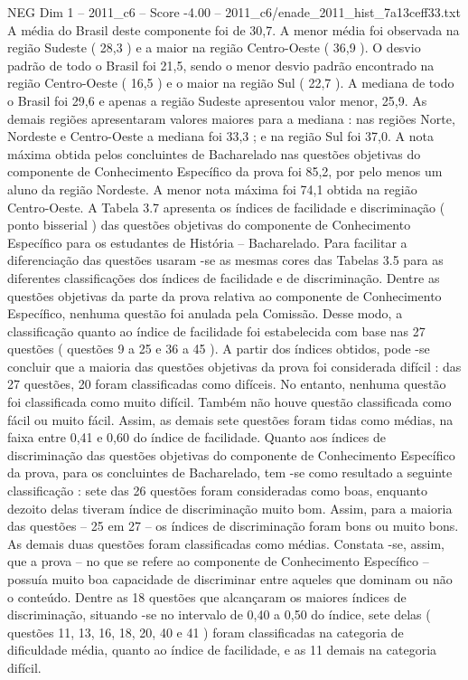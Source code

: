 \begin{textsample}{NEG Dim 1 – 2011\_c6 – Score -4.00 – 2011\_c6/enade\_2011\_hist\_7a13ceff33.txt}
A média do Brasil deste componente foi de 30,7.
A menor média foi observada na região Sudeste ( 28,3 ) e a maior na região Centro-Oeste ( 36,9 ).
O desvio padrão de todo o Brasil foi 21,5, sendo o menor desvio padrão encontrado na região Centro-Oeste ( 16,5 ) e o maior na região Sul ( 22,7 ).
A mediana de todo o Brasil foi 29,6 e apenas a região Sudeste apresentou valor menor, 25,9.
As demais regiões apresentaram valores maiores para a mediana : nas regiões Norte, Nordeste e Centro-Oeste a mediana foi 33,3 ; e na região Sul foi 37,0.
A nota máxima obtida pelos concluintes de Bacharelado nas questões objetivas do componente de Conhecimento Específico da prova foi 85,2, por pelo menos um aluno da região Nordeste.
A menor nota máxima foi 74,1 obtida na região Centro-Oeste.
A Tabela 3.7 apresenta os índices de facilidade e discriminação ( ponto bisserial ) das questões objetivas do componente de Conhecimento Específico para os estudantes de História – Bacharelado.
Para facilitar a diferenciação das questões usaram -se as mesmas cores das Tabelas 3.5 para as diferentes classificações dos índices de facilidade e de discriminação.
Dentre as questões objetivas da parte da prova relativa ao componente de Conhecimento Específico, nenhuma questão foi anulada pela Comissão.
Desse modo, a classificação quanto ao índice de facilidade foi estabelecida com base nas 27 questões ( questões 9 a 25 e 36 a 45 ).
A partir dos índices obtidos, pode -se concluir que a maioria das questões objetivas da prova foi considerada difícil : das 27 questões, 20 foram classificadas como difíceis.
No entanto, nenhuma questão foi classificada como muito difícil.
Também não houve questão classificada como fácil ou muito fácil.
Assim, as demais sete questões foram tidas como médias, na faixa entre 0,41 e 0,60 do índice de facilidade.
Quanto aos índices de discriminação das questões objetivas do componente de Conhecimento Específico da prova, para os concluintes de Bacharelado, tem -se como resultado a seguinte classificação : sete das 26 questões foram consideradas como boas, enquanto dezoito delas tiveram índice de discriminação muito bom.
Assim, para a maioria das questões – 25 em 27 – os índices de discriminação foram bons ou muito bons.
As demais duas questões foram classificadas como médias.
Constata -se, assim, que a prova – no que se refere ao componente de Conhecimento Específico – possuía muito boa capacidade de discriminar entre aqueles que dominam ou não o conteúdo.
Dentre as 18 questões que alcançaram os maiores índices de discriminação, situando -se no intervalo de 0,40 a 0,50 do índice, sete delas ( questões 11, 13, 16, 18, 20, 40 e 41 ) foram classificadas na categoria de dificuldade média, quanto ao índice de facilidade, e as 11 demais na categoria difícil.

\end{textsample}

